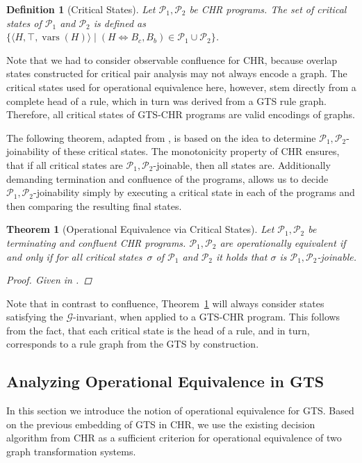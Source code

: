 \documentclass{tlp}
\newtheorem{theorem}{Theorem}\newtheorem{corollary}[theorem]{Corollary}
\newtheorem{definition}{Definition}[section]
\newcommand{\st}[3]{\ensuremath{\langle #1 , #2 , #3 \rangle}}
\newcommand{\mcG}{\ensuremath{\mathcal{G}}}
\newcommand{\mcP}{\ensuremath{\mathcal{P}}}
\newcommand{\Ps}{\ensuremath{\mcP_1,\mcP_2}}
\DeclareMathOperator{\vars}{vars}
\begin{document}
\begin{definition}[Critical States]\label{def:critical_states} 
Let $\Ps$ be CHR programs. The set of \emph{critical states of $\mcP_1$ and
$\mcP_2$} is defined as $\{ \st{H}{\top}{\vars(H)} \mid (H \Leftrightarrow
B_c,B_b) \in \mcP_1 \cup \mcP_2 \}$.
\end{definition}

Note that we had to consider observable confluence for CHR, because overlap
states constructed for critical pair analysis may not always encode a graph. The
critical states used for operational equivalence here, however, stem directly
from a complete head of a rule, which in turn was derived from a GTS rule graph.
Therefore, all critical states of GTS-CHR programs are valid encodings of
graphs.

The following theorem, adapted from \cite{abdennadherfruehwirth99}, is based on
the idea to determine \Ps-joinability of these critical states. The monotonicity
property of CHR ensures, that if all critical states are \Ps-joinable, then all
states are. Additionally demanding termination and confluence of the programs,
allows us to decide \Ps-joinability simply by executing a critical state in each
of the programs and then comparing the resulting final states.

\begin{theorem}[Operational Equivalence via Critical States]\label{thm:opeq} Let
$\Ps$ be terminating and confluent CHR programs. $\Ps$ are operationally
equivalent if and only if for all critical states~$\sigma$ of $\mcP_1$ and
$\mcP_2$ it holds that $\sigma$ is \Ps-joinable.
\begin{proof}
Given in \cite{abdennadherfruehwirth99}.
\end{proof}
\end{theorem}

Note that in contrast to confluence, Theorem~\ref{thm:opeq} will always consider
states satisfying the \mcG-invariant, when applied to a GTS-CHR program. This
follows from the fact, that each critical state is the head of a rule, and in
turn, corresponds to a rule graph from the GTS by construction.

\subsection{Analyzing Operational Equivalence in GTS}
\label{sec:opeq_gts}

In this section we introduce the notion of operational equivalence for GTS. Based
on the previous embedding of GTS in CHR, we use the existing decision algorithm
from CHR as a sufficient criterion for operational equivalence of two graph
transformation systems.
\end{document}
